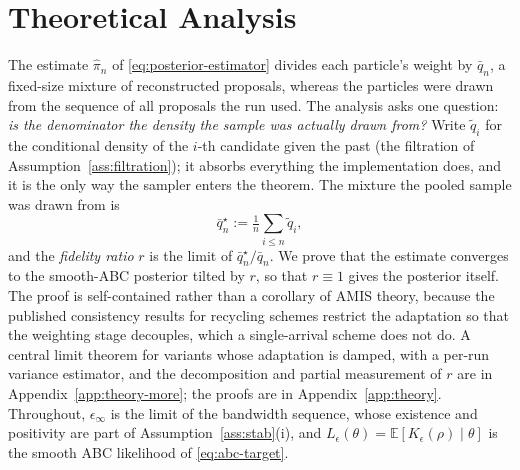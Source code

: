 \documentclass[10pt]{article}
\theoremstyle{plain}
\theoremstyle{definition}
\begin{document}
\section{Theoretical Analysis}\label{sec:theory}
The estimate $\widehat\pi_n$ of \eqref{eq:posterior-estimator} divides each particle's weight by $\bar q_n$, a fixed-size mixture of reconstructed proposals, whereas the particles were drawn from the sequence of all proposals the run used. The analysis asks one question: \emph{is the denominator the density the sample was actually drawn from?} Write $\tilde q_i$ for the conditional density of the $i$-th candidate given the past (the filtration of Assumption~\ref{ass:filtration}); it absorbs everything the implementation does, and it is the only way the sampler enters the theorem. The mixture the pooled sample was drawn from is
\begin{equation}
\bar q^\star_n:=\tfrac1n\textstyle\sum_{i\le n}\tilde q_i,
\label{eq:draw-mixture}
\end{equation}
and the \emph{fidelity ratio} $r$ is the limit of $\bar q^\star_n/\bar q_n$. We prove that the estimate converges to the smooth-ABC posterior tilted by $r$, so that $r\equiv1$ gives the posterior itself. The proof is self-contained rather than a corollary of AMIS theory, because the published consistency results for recycling schemes \citep{marin2019consistency} restrict the adaptation so that the weighting stage decouples, which a single-arrival scheme does not do. A central limit theorem for variants whose adaptation is damped, with a per-run variance estimator, and the decomposition and partial measurement of $r$ are in Appendix~\ref{app:theory-more}; the proofs are in Appendix~\ref{app:theory}. Throughout, $\epsilon_\infty$ is the limit of the bandwidth sequence, whose existence and positivity are part of Assumption~\ref{ass:stab}(i), and $L_\epsilon(\theta)=\mathbb{E}[K_\epsilon(\rho)\mid\theta]$ is the smooth ABC likelihood of \eqref{eq:abc-target}.
\end{document}

